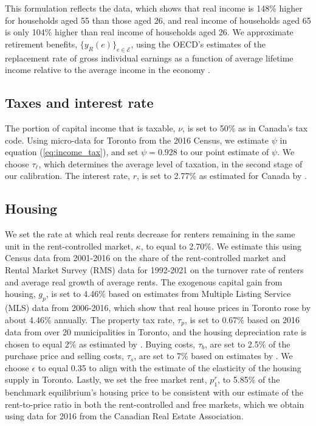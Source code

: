 \documentclass[parskip=full]{article}
\begin{document}
\noindent This formulation reflects the data, which shows that real income is 148\% higher for households aged 55 than those aged 26, and real income of households aged 65 is only 104\% higher than real income of households aged 26. We approximate retirement benefits, $\{y_{R}(e)\}_{e\in \mathcal{E}}$, using the OECD's estimates of the replacement rate of gross individual earnings as a function of average lifetime income relative to the average income in the economy \citep{OECD-pension}.

\subsection{Taxes and interest rate}
The portion of capital income that is taxable, $
\nu$, is set to 50\% as in Canada's tax code. Using micro-data for Toronto from the 2016 Census, we estimate $\psi$ in equation (\ref{eq:income_tax}), and set $\psi=0.928$ to our point estimate of $\psi$. We choose $\tau_{\ell}$, which determines the average level of taxation, in the second stage of our calibration. The interest rate, $r$, is set to 2.77\% as estimated for Canada by \citet{bruneau-etal-2018}. 


\subsection{Housing}

We set the rate at which real rents decrease for renters remaining in the same unit in the rent-controlled market, $\kappa$, to equal to 2.70\%. We estimate this using Census data from 2001-2016 on the share of the rent-controlled market and Rental Market Survey (RMS) data for 1992-2021 on the turnover rate of renters and average real growth of average rents. The exogenous capital gain from housing, $g_{p}$, is set to 4.46\% based on estimates from Multiple Listing Service (MLS) data from 2006-2016, which show that real house prices in Toronto rose by about 4.46\% annually. The property tax rate, $\tau_p$, is set to 0.67\% based on 2016 data from over 20 municipalities in Toronto, and the housing depreciation rate is chosen to equal 2\% as estimated by \citet{hardingetal-2007}. Buying costs, $\tau_{b}$, are set to 2.5\% of the purchase price and selling costs, $\tau_{s}$, are set to 7\% based on estimates by \citet{gm-2003}. We choose $\epsilon$ to equal 0.35 to align with the \citet{cmhc-report-2018} estimate of the elasticity of the housing supply in Toronto. Lastly, we set the free market rent, $p^{r}_{1}$, to 5.85\% of the benchmark equilibrium's housing price to be consistent with our estimate of the rent-to-price ratio in both the rent-controlled and free markets, which we obtain using data for 2016 from the Canadian Real Estate Association.
\end{document}
